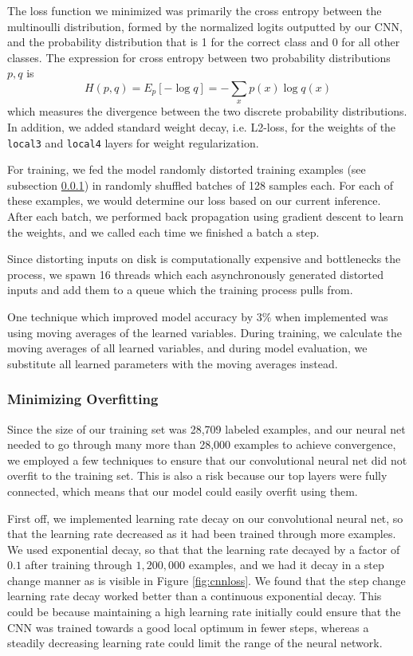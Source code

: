 \documentclass[11pt, twocolumn, twoside]{article}
\begin{document}
The loss function we minimized was primarily the cross entropy between the multinoulli distribution, formed by the normalized logits outputted by our CNN, and the probability distribution that is 1 for the correct class and 0 for all other classes. The expression for cross entropy between two probability distributions $p, q$ is
\[H(p, q) = E_p[-\log q] = -\sum_x p(x)\log q(x)\]
which measures the divergence between the two discrete probability distributions. In addition, we added standard weight decay, i.e. L2-loss, for the weights of the \texttt{local3} and \texttt{local4} layers for weight regularization.

For training, we fed the model randomly distorted training examples (see subsection \ref{overfitting}) in randomly shuffled batches of 128 samples each. For each of these examples, we would determine our loss based on our current inference. After each batch, we performed back propagation using gradient descent to learn the weights, and we called each time we finished a batch a step. 

Since distorting inputs on disk is computationally expensive and bottlenecks the process, we spawn 16 threads which each asynchronously generated distorted inputs and add them to a queue which the training process pulls from.

One technique which improved model accuracy by $3\%$ when implemented was using moving averages of the learned variables. During training, we calculate the moving averages of all learned variables, and during model evaluation, we substitute all learned parameters with the moving averages instead.


\subsubsection{Minimizing Overfitting} \label{overfitting}

Since the size of our training set was 28,709 labeled examples, and our neural net needed to go through many more than 28,000 examples to achieve convergence, we employed a few techniques to ensure that our convolutional neural net did not overfit to the training set. This is also a risk because our top layers were fully connected, which means that our model could easily overfit using them.

First off, we implemented learning rate decay on our convolutional neural net, so that the learning rate decreased as it had been trained through more examples. We used exponential decay, so that that the learning rate decayed by a factor of $0.1$ after training through $1,200,000$ examples, and we had it decay in a step change manner as is visible in Figure \ref{fig:cnnloss}. We found that the step change learning rate decay worked better than a continuous exponential decay. This could be because maintaining a high learning rate initially could ensure that the CNN was trained towards a good local optimum in fewer steps, whereas a steadily decreasing learning rate could limit the range of the neural network.
\end{document}
